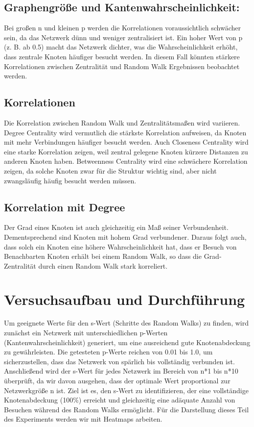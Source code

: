 \subsection{Graphengröße und Kantenwahrscheinlichkeit: }
 Bei großen n und kleinen p werden die Korrelationen voraussichtlich schwächer sein, da das Netzwerk dünn und weniger zentralisiert ist. Ein hoher Wert von p (z. B. ab 0.5) macht das Netzwerk dichter, was die Wahrscheinlichkeit erhöht, dass zentrale Knoten häufiger besucht werden. In diesem Fall könnten stärkere Korrelationen zwischen Zentralität und Random Walk Ergebnissen beobachtet werden. 

\subsection{ Korrelationen}
 Die Korrelation zwischen Random Walk und Zentralitätsmaßen wird variieren. Degree Centrality wird vermutlich die stärkste Korrelation aufweisen, da Knoten mit mehr Verbindungen häufiger besucht werden. Auch Closeness Centrality wird eine starke Korrelation zeigen, weil zentral gelegene Knoten kürzere Distanzen zu anderen Knoten haben. Betweenness Centrality wird eine schwächere Korrelation zeigen, da solche Knoten zwar für die Struktur wichtig sind, aber nicht zwangsläufig häufig besucht werden müssen. 

\subsection{ Korrelation mit Degree}
Der Grad eines Knoten ist auch gleichzeitig ein Maß seiner Verbundenheit. Dementsprechend sind Knoten mit hohem Grad verbundener. Daraus folgt auch, dass solch ein Knoten eine höhere Wahrscheinlichkeit hat, dass er Besuch von Benachbarten Knoten erhält bei einem Random Walk, so dass die Grad-Zentralität durch einen Random Walk stark korreliert.

\section{Versuchsaufbau und Durchführung}

Um geeignete Werte für den s-Wert (Schritte des Random Walks) zu finden, wird zunächst ein Netzwerk mit unterschiedlichen p-Werten (Kantenwahrscheinlichkeit) generiert, um eine ausreichend gute Knotenabdeckung zu gewährleisten. Die getesteten p-Werte reichen von 0.01 bis 1.0, um sicherzustellen, dass das Netzwerk von spärlich bis vollständig verbunden ist. Anschließend wird der s-Wert für jedes Netzwerk im Bereich von n*1 bis n*10 überprüft, da wir davon ausgehen, dass der optimale Wert proportional zur Netzwerkgröße n ist. Ziel ist es, den s-Wert zu identifizieren, der eine vollständige Knotenabdeckung (100\%) erreicht und gleichzeitig eine adäquate Anzahl von Besuchen während des Random Walks ermöglicht. Für die Darstellung dieses Teil des Experiments werden wir mit Heatmaps arbeiten.  

